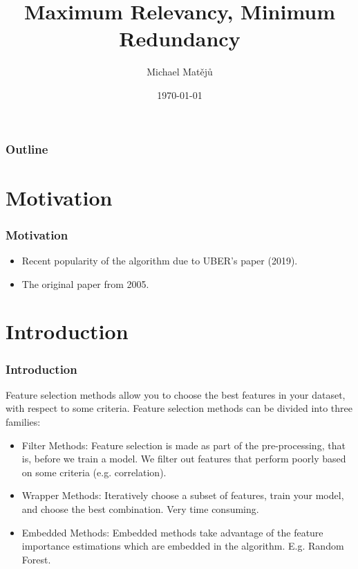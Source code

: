\documentclass{beamer}
\title[MRMR]{Maximum Relevancy, Minimum Redundancy}
\author{Michael Mat\v{e}j\r{u}}
\institute[KB]{AI Squad}
\date{\today}
\begin{document}
    \begin{frame}
        \titlepage
    \end{frame}

    \begin{frame}
        \frametitle{Outline}
        \tableofcontents
    \end{frame}


    \section{Motivation}
    \begin{frame}
        \frametitle{Motivation}
        \begin{itemize}
            \item Recent popularity of the algorithm due to UBER's paper (2019).
            \pause
            \item The original paper from 2005.
        \end{itemize}
    \end{frame}


    \section{Introduction}
    \begin{frame}
        \frametitle{Introduction}
        Feature selection methods allow you to choose the best features in your dataset, with
        respect to some criteria. Feature selection methods can be divided into three families:
        \pause
        \begin{itemize}
            \item Filter Methods: Feature selection is made as part of the pre-processing, that
            is, before we train a model. We filter out features that perform poorly based on some
            criteria (e.g. correlation).
            \pause
            \item Wrapper Methods: Iteratively choose a subset of features, train your model,
            and choose the best combination. Very time consuming.
            \pause
            \item Embedded Methods: Embedded methods take advantage of the feature importance
            estimations which are embedded in the algorithm. E.g. Random Forest.
        \end{itemize}
    \end{frame}
\end{document}

